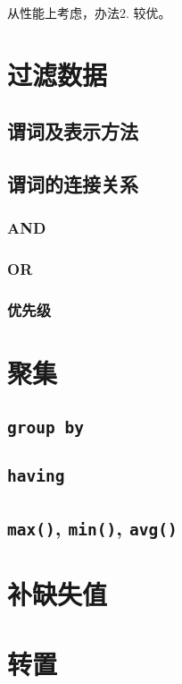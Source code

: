 \documentclass[11pt]{article}
\newcommand{\id}[1]{\texttt{#1}}
\newcommand{\kw}[1]{\texttt{\textbf{#1}}}
\begin{document}
从性能上考虑，办法2. 较优。

\section{过滤数据}
\subsection{谓词及表示方法}
\subsection{谓词的连接关系}
\subsubsection{AND}
\subsubsection{OR}
\subsubsection{优先级}
\section{聚集}
\subsection{\kw{group by}}
\subsection{\kw{having}}
\subsection{\id{max()}, \id{min()}, \id{avg()}}
\section{补缺失值}

\section{转置}
\end{document}
